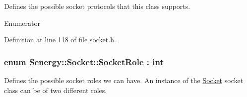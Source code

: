 Defines the possible socket protocols that this class supports. 

\begin{Desc}
\item[Enumerator]\par
\begin{description}
\item[{\em 
\hypertarget{class_senergy_1_1_socket_ad400245278746ac26e261bdda171c178ab136ef5f6a01d816991fe3cf7a6ac763}{T\-C\-P}\label{class_senergy_1_1_socket_ad400245278746ac26e261bdda171c178ab136ef5f6a01d816991fe3cf7a6ac763}
}]\item[{\em 
\hypertarget{class_senergy_1_1_socket_ad400245278746ac26e261bdda171c178af5ef036b4d8b630721e51fe23489fbc9}{U\-D\-P}\label{class_senergy_1_1_socket_ad400245278746ac26e261bdda171c178af5ef036b4d8b630721e51fe23489fbc9}
}]\end{description}
\end{Desc}


Definition at line 118 of file socket.\-h.

\hypertarget{class_senergy_1_1_socket_ad82ad4c4412684091e687b92641bfbe9}{
\subsubsection[{Socket\-Role}]{\setlength{\rightskip}{0pt plus 5cm}enum {\bf Senergy\-::\-Socket\-::\-Socket\-Role} \-: int\hspace{0.3cm}{\ttfamily [strong]}}}\label{class_senergy_1_1_socket_ad82ad4c4412684091e687b92641bfbe9}


Defines the possible socket roles we can have. An instance of the \hyperlink{class_senergy_1_1_socket}{Socket} socket class can be of two different roles. 

